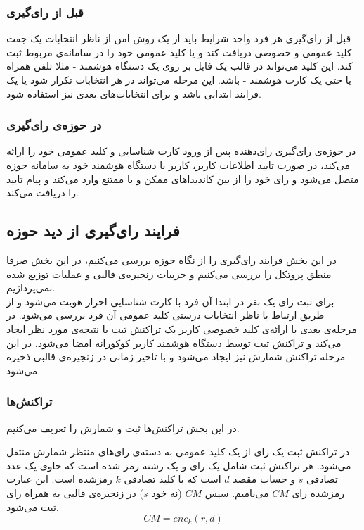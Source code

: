 \subsubsection{قبل از رای‌گیری}
قبل از رای‌گیری هر فرد واجد شرایط باید از یک روش امن از ناظر انتخابات یک جفت کلید عمومی و خصوصی دریافت کند و یا کلید عمومی خود را در سامانه‌ی مربوط ثبت کند. این کلید می‌تواند در قالب یک فایل بر روی یک دستگاه هوشمند - مثلا تلفن همراه یا حتی یک کارت هوشمند - باشد. این مرحله  می‌تواند در هر انتخابات تکرار شود یا یک فرایند ابتدایی باشد و برای انتخابات‌های بعدی نیز استفاده شود. 
\subsubsection{در حوزه‌ی رای‌گیری}
در حوزه‌ی رای‌گیری رای‌دهنده پس از ورود کارت شناسایی و کلید عمومی خود را ارائه می‌کند، در صورت تایید اطلاعات کاربر، کاربر با دستگاه هوشمند خود به سامانه‌ حوزه متصل می‌شود و رای‌ خود را از بین‌ کاندیدا‌های ممکن و یا ممتنع وارد می‌کند و پیام تایید را دریافت می‌کند. 
\subsection{فرایند رای‌گیری از دید حوزه‌}
در این بخش فرایند رای‌گیری را از نگاه حوزه‌ بررسی می‌کنیم، در این بخش صرفا منطق پروتکل را بررسی می‌کنیم و جزییات زنجیره‌ی قالبی و عملیات توزیع شده نمی‌پردازیم. 
\\
برای ثبت رای یک‌ نفر در ابتدا آن فرد با کارت شناسایی احراز هویت می‌شود و از طریق ارتباط با ناظر انتخابات درستی کلید عمومی آن فرد بررسی می‌شود. در مرحله‌ی بعدی با ارائه‌ی کلید خصوصی کاربر یک تراکنش ثبت با نتیجه‌ی مورد نظر ایجاد می‌کند و تراکنش ثبت توسط دستگاه هوشمند کاربر کوکورانه امضا می‌شود. در این مرحله تراکنش شمارش نیز ایجاد می‌شود و با تاخیر زمانی در زنجیره‌ی قالبی ذخیره می‌شود.

\subsubsection{تراکنش‌ها}
در این بخش تراکنش‌ها ثبت و شمارش را تعریف می‌کنیم.
\par
در تراکنش ثبت یک رای از یک کلید عمومی به دسته‌ی رای‌های منتظر شمارش منتقل می‌شود. هر تراکنش ثبت شامل یک رای و یک رشته 
رمز شده است که حاوی یک عدد تصادفی $s$ و حساب مقصد $d$ است که با کلید تصادفی $k$ رمزشده است. این عبارت رمز‌شده رای $CM$ می‌نامیم. سپس $CM$ (نه خود $s$) در زنجیره‌ی قالبی به همراه رای ثبت می‌شود.
\\
\begin{equation}
CM = enc_{k} (r, d)
\label{eq:enc}
\end{equation}

